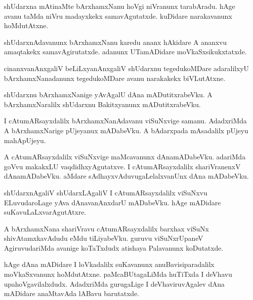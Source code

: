 \documentclass{article}
\begin{document}
\begin{mn}%
shUdarxna mAtinaMte bArxhamxNanu hoVgi niVranunx tarabAradu. hAge avanu taMda niVru madayxkekx 
samavAgutatxde. kuDidare narakavanunx hoMdutAtxne.
\end{mn}

\begin{mn}%
shUdarxnAdavanunx bArxhamxNanu karedu ananx hAkidare A ananxvu amaqtakekx samavAgirutatxde. adanunx 
UTamADidare moVkaSxsikukxtatxde.
\end{mn}

\begin{mn}%
cinanxvanAnxgaliV beLiLxyanAnxgaliV shUdarxnu tegedukoMDare adaralilxyU bArxhamxNanadanunx 
tegedukoMDare avanu narakakekx biVLutAtxne.
\end{mn}

\begin{mn}%
shUdarxnu bArxhamxNanige yAvAgalU dAna mADutitxrabeVku. A bArxhamxNaralilx shUdarxnu Bakitxyanunx 
mADutitxrabeVku.
\end{mn}

\begin{mn}%
I cAtumARsayxdalilx bArxhamxNanAdavanu viSuNxvige samanu. AdadxriMda A bArxhamxNarige pUjeyanux 
mADabeVku. A bAdarxpada mAsadalilx pUjeyu mahApUjeyu.
\end{mn}

\begin{mn}%
A cAtumARsayxdalilx viSuNxvige maMcavanunx dAnamADabeVku. adariMda goVvu makakxLU 
vaqdidhxyAgutatxve. I cAtumARsayxdalilx shariVranenxV dAnamADabeVku. aMdare 
sAdhayxvAduvugaLelalxvanUnx dAna mADabeVku.
\end{mn}

\begin{mn}%
shUdarxnAgaliV shUdarxLAgaliV I cAtumARsayxdalilx viSuNxvu ELuvudaroLage yAva dAnavanAnxdarU 
mADabeVku. hAge mADidare suKavuLaLxvarAgutAtxre.
\end{mn}

\begin{mn}%
A bArxhamxNana shariVravu cAtumARsayxdalilx barxhax viSuNx shivAtamxkavAdudu eMdu tiLiyabeVku. 
guruvu viSuNxrUpaneV AgiruvudariMda avanige koTaTxdudx atishaya Palavanunx koDutatxde.
\end{mn}

\begin{mn}%
hAge dAna mADidare I loVkadalilx suKavanunx anuBavisiparadalilx moVkaSxvanunx hoMdutAtxne. 
paMcaBUtagaLiMda huTiTxda I deVhavu upahoVgavilalxdudx. AdadxriMda gurugaLige I deVhaviruvAgalev 
dAna mADidare anaMtavAda lABavu barutatxde.
\end{mn}
\end{document}
